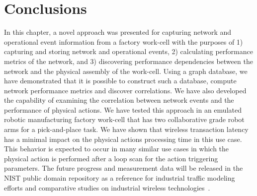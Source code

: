 \section{Conclusions} \label{gdbappl:sec::conclusion}
In this chapter, a novel approach was presented for capturing network and operational event information from a factory work-cell with the  purposes of 1) capturing and storing network and operational events, 2) calculating performance metrics of the network, and 3) discovering performance dependencies between the network and the physical assembly of the work-cell. Using a graph database, we have demonstrated that it is possible to construct such a database, compute network performance metrics and discover correlations. We have also developed the capability of examining the correlation between network events and the performance of physical actions. We have tested this approach in an emulated robotic manufacturing factory work-cell that has two collaborative grade robot arms for a pick-and-place task. We have shown that wireless transaction latency has a minimal impact on the physical actions processing time in this use case. This behavior is expected to occur in many similar use cases in which the physical action is performed after a loop scan for the action triggering parameters. 
The future progress and measurement data will be released in the NIST public domain repository as a reference for industrial traffic modeling efforts and comparative studies on industrial wireless technologies~\cite{Candell2019PROJECTURL}.



%
